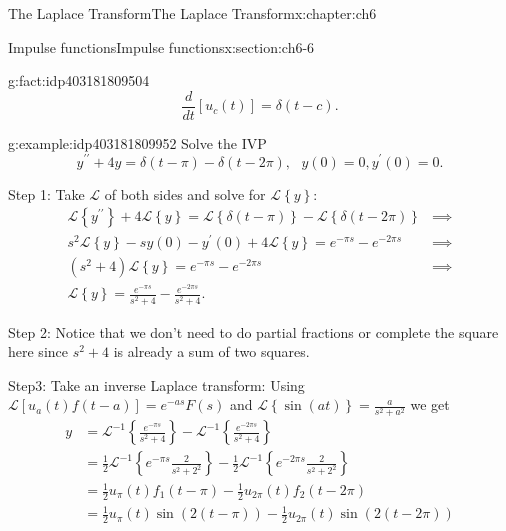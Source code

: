 \documentclass[oneside,10pt,]{book}
\numberwithin{equation}{section}
\numberwithin{equation}{section}
\newcommand{\amp}{&}
\begin{document}
\begin{chapterptx}{The Laplace Transform}{}{The Laplace Transform}{}{}{x:chapter:ch6}
\begin{sectionptx}{Impulse functions}{}{Impulse functions}{}{}{x:section:ch6-6}
\begin{fact}{}{}{g:fact:idp403181809504}%
%
\begin{equation*}
\frac{d}{dt}\left[u_{c}(t)\right]=\delta\left(t-c\right).
\end{equation*}
\end{fact}
\begin{example}{}{g:example:idp403181809952}%
Solve the IVP%
\begin{equation*}
y^{\prime\prime}+4y=\delta\left(t-\pi\right)-\delta\left(t-2\pi\right),\,\,\,\,y(0)=0,y^{\prime}(0)=0.
\end{equation*}
%
\par
Step 1: Take \(\mathcal{L}\) of both sides and solve for \(\mathcal{L}\left\{ y\right\} \):%
\begin{align*}
\mathcal{L}\left\{ y^{\prime\prime}\right\} +4\mathcal{L}\left\{ y\right\} =\mathcal{L}\left\{ \delta\left(t-\pi\right)\right\} -\mathcal{L}\left\{ \delta\left(t-2\pi\right)\right\}  \amp \implies\\
s^{2}\mathcal{L}\left\{ y\right\} -sy(0)-y^{\prime}(0)+4\mathcal{L}\left\{ y\right\} =e^{-\pi s}-e^{-2\pi s} \amp \implies\\
\left(s^{2}+4\right)\mathcal{L}\left\{ y\right\} =e^{-\pi s}-e^{-2\pi s} \amp \implies\\
\mathcal{L}\left\{ y\right\} =\frac{e^{-\pi s}}{s^{2}+4}-\frac{e^{-2\pi s}}{s^{2}+4}.
\end{align*}
%
\par
Step 2: Notice that we don't need to do partial fractions or complete the square here since \(s^{2}+4\) is already a sum of two squares.%
\par
Step3: Take an inverse Laplace transform: Using \(\mathcal{L}\left[u_{a}(t)f(t-a)\right]=e^{-as}F(s)\) and \(\mathcal{L}\left\{ \sin(at)\right\} =\frac{a}{s^{2}+a^{2}}\) we get%
\begin{align*}
y \amp =\mathcal{L}^{-1}\left\{ \frac{e^{-\pi s}}{s^{2}+4}\right\} -\mathcal{L}^{-1}\left\{ \frac{e^{-2\pi s}}{s^{2}+4}\right\} \\
\amp =\frac{1}{2}\mathcal{L}^{-1}\left\{ e^{-\pi s}\frac{2}{s^{2}+2^{2}}\right\} -\frac{1}{2}\mathcal{L}^{-1}\left\{ e^{-2\pi s}\frac{2}{s^{2}+2^{2}}\right\} \\
\amp =\frac{1}{2}u_{\pi}(t)f_{1}\left(t-\pi\right)-\frac{1}{2}u_{2\pi}(t)f_{2}\left(t-2\pi\right)\\
\amp =\frac{1}{2}u_{\pi}(t)\sin\left(2\left(t-\pi\right)\right)-\frac{1}{2}u_{2\pi}(t)\sin\left(2\left(t-2\pi\right)\right)
\end{align*}

\end{example}
\end{sectionptx}
\end{chapterptx}
\end{document}
